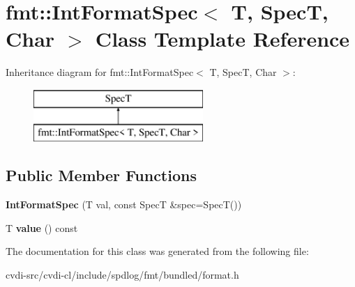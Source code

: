 \hypertarget{classfmt_1_1IntFormatSpec}{}\section{fmt\+:\+:Int\+Format\+Spec$<$ T, SpecT, Char $>$ Class Template Reference}
\label{classfmt_1_1IntFormatSpec}
Inheritance diagram for fmt\+:\+:Int\+Format\+Spec$<$ T, SpecT, Char $>$\+:\begin{figure}[H]
\begin{center}
\leavevmode
\includegraphics[height=2.000000cm]{classfmt_1_1IntFormatSpec}
\end{center}
\end{figure}
\subsection*{Public Member Functions}
\begin{DoxyCompactItemize}
\item 
{\bfseries Int\+Format\+Spec} (T val, const SpecT \&spec=SpecT())\hypertarget{classfmt_1_1IntFormatSpec_ab3ddcce25115287cbd61e228076d9d8d}{}\label{classfmt_1_1IntFormatSpec_ab3ddcce25115287cbd61e228076d9d8d}

\item 
T {\bfseries value} () const \hypertarget{classfmt_1_1IntFormatSpec_a8d78e074d34780590a4d209e3601947d}{}\label{classfmt_1_1IntFormatSpec_a8d78e074d34780590a4d209e3601947d}

\end{DoxyCompactItemize}


The documentation for this class was generated from the following file\+:\begin{DoxyCompactItemize}
\item 
cvdi-\/src/cvdi-\/cl/include/spdlog/fmt/bundled/format.\+h\end{DoxyCompactItemize}

